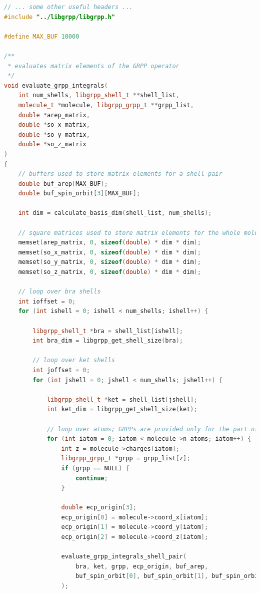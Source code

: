 \documentclass[12pt]{article}
\begin{document}
\begin{lstlisting}[language=C++]
// ... some other useful headers ...
#include "../libgrpp/libgrpp.h"

#define MAX_BUF 10000

/**
 * evaluates matrix elements of the GRPP operator
 */
void evaluate_grpp_integrals(
    int num_shells, libgrpp_shell_t **shell_list,
    molecule_t *molecule, libgrpp_grpp_t **grpp_list,
    double *arep_matrix,
    double *so_x_matrix,
    double *so_y_matrix,
    double *so_z_matrix
)
{
    // buffers used to store matrix elements for a shell pair
    double buf_arep[MAX_BUF];
    double buf_spin_orbit[3][MAX_BUF];
    
    int dim = calculate_basis_dim(shell_list, num_shells);

    // square matrices used to store matrix elements for the whole molecule
    memset(arep_matrix, 0, sizeof(double) * dim * dim);
    memset(so_x_matrix, 0, sizeof(double) * dim * dim);
    memset(so_y_matrix, 0, sizeof(double) * dim * dim);
    memset(so_z_matrix, 0, sizeof(double) * dim * dim);

    // loop over bra shells
    int ioffset = 0;
    for (int ishell = 0; ishell < num_shells; ishell++) {

        libgrpp_shell_t *bra = shell_list[ishell];
        int bra_dim = libgrpp_get_shell_size(bra);

        // loop over ket shells
        int joffset = 0;
        for (int jshell = 0; jshell < num_shells; jshell++) {
        
            libgrpp_shell_t *ket = shell_list[jshell];
            int ket_dim = libgrpp_get_shell_size(ket);

            // loop over atoms; GRPPs are provided only for the part of atoms
            for (int iatom = 0; iatom < molecule->n_atoms; iatom++) {
                int z = molecule->charges[iatom];
                libgrpp_grpp_t *grpp = grpp_list[z];
                if (grpp == NULL) {
                    continue;
                }
                
                double ecp_origin[3];
                ecp_origin[0] = molecule->coord_x[iatom];
                ecp_origin[1] = molecule->coord_y[iatom];
                ecp_origin[2] = molecule->coord_z[iatom];

                evaluate_grpp_integrals_shell_pair(
                    bra, ket, grpp, ecp_origin, buf_arep,
                    buf_spin_orbit[0], buf_spin_orbit[1], buf_spin_orbit[2]
                );
                

\end{lstlisting}
\end{document}
